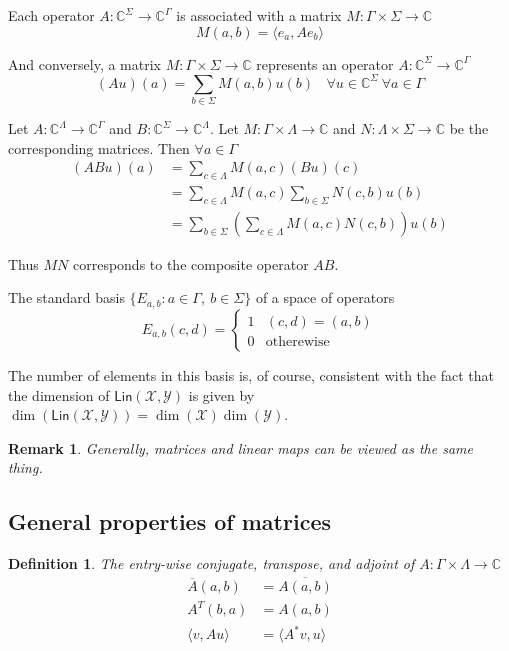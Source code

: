 \documentclass[aps,pra,onecolumn,notitlepage,superscriptaddress]{revtex4-1}
\newcommand{\C}{\mathbb{C}}
\newcommand{\spc}[1]{\mathcal{#1}}
\newcommand{\Lin}{\mathsf{Lin}}
\def\>{\rangle}
\def\<{\langle}
\newtheorem{defi}{Definition}
\newtheorem{rem}{Remark}
\begin{document}
    Each operator $A: \C^{\Sigma} \to \C^{\Gamma}$ is associated with a matrix $M : \Gamma \times \Sigma \to \C$
    \begin{equation}
        M(a,b) = \< e_a, Ae_b \>
    \end{equation}

    And conversely, a matrix $M : \Gamma \times \Sigma \to \C$ represents an operator $A: \C^{\Sigma} \to \C^{\Gamma}$
    \begin{equation}
        (Au)(a) = \sum_{b \in \Sigma} M(a,b) u(b) \ \ \ \ \forall u \in \C^{\Sigma} \ \forall a \in \Gamma
    \end{equation}

    Let $A: \C^{\Lambda} \to \C^{\Gamma}$ and $B: \C^{\Sigma} \to \C^{\Lambda}$. Let $M : \Gamma \times \Lambda \to \C$ and $N : \Lambda \times \Sigma \to \C$ be the corresponding matrices. Then $\forall a \in \Gamma$
    \begin{align}
        (ABu)(a) 
        &= \sum_{c \in \Lambda} M(a,c) (Bu)(c) \\
        &= \sum_{c \in \Lambda} M(a,c) \sum_{b \in \Sigma} N(c,b) u(b) \\
        &= \sum_{b \in \Sigma} \left( \sum_{c \in \Lambda} M(a,c)N(c,b) \right) u(b)
    \end{align}

    Thus $MN$ corresponds to the composite operator $AB$.

    The standard basis $\{ E_{a,b} : a \in \Gamma, \ b \in \Sigma \}$ of a space of operators
    \begin{equation}
        E_{a,b} (c,d) = \begin{cases}
            1 & (c,d) = (a,b) \\
            0 & \text{otherewise}
        \end{cases}
    \end{equation}

    The number of elements in this basis is, of course, consistent with the fact that the dimension of $\Lin(\spc X,\spc Y)$ is given by $\dim(\Lin(\spc X, \spc Y)) = \dim(\spc X)\dim(\spc Y)$.

    \begin{rem}
        Generally, matrices and linear maps can be viewed as the same thing.
    \end{rem}

    \subsection{General properties of matrices}
    \begin{defi}
        The entry-wise conjugate, transpose, and adjoint of $A : \Gamma \times \Lambda \to \C$
        \begin{align}
            \overline{A}(a,b) &= \overline{A(a,b)} \\
            A^T(b,a) &= A(a,b) \\
            \< v, Au \> &= \< A^*v, u \>
        \end{align}
    \end{defi}
\end{document}
